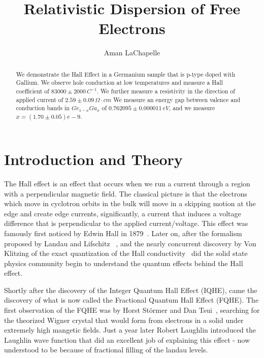 \documentclass[reprint, nobibnotes, amssymb, amsmath, amsfonts, physics, mathtools, mathrsfs, floatfix]{revtex4-1}
\begin{document}
  \title{Relativistic Dispersion of Free Electrons}

  \author{Aman LaChapelle}

  \begin{abstract}
    We demonstrate the Hall Effect in a Germanium sample that is p-type doped with Gallium.  We observe hole conduction at low temperatures and measure a Hall coefficient of $83000 \pm 2000\,C^{-1}$.  We further measure a resistivity in the direction of applied current of $2.59\pm0.09\,\Omega \cdot cm$  We measure an energy gap between valence and conduction bands in $Ge_{1-x}Ga_x$ of $0.762095\pm0.000011 \, eV$, and we measure $x = (1.70\pm0.05)e-9$.
  \end{abstract}

  \maketitle
  \tableofcontents

  \section{Introduction and Theory}
    The Hall effect is an effect that occurs when we run a current through a region with a perpendicular magnetic field.  The classical picture is that the electrons which move in cyclotron orbits in the bulk will move in a skipping motion at the edge and create edge currents, significantly, a current that induces a voltage difference that is perpendicular to the applied current/voltage.  This effect was famously first noticed by Edwin Hall in 1879~\cite{classical_hall}.  Later on, after the formalism proposed by Landau and Lifschitz ~\cite{landau}, and the nearly concurrent discovery by Von Klitzing of the exact quantization of the Hall conductivity~\cite{Von_Klitzing} did the solid state physics community begin to understand the quantum effects behind the Hall effect.

    Shortly after the discovery of the Integer Quantum Hall Effect (IQHE), came the discovery of what is now called the Fractional Quantum Hall Effect (FQHE).  The first observation of the FQHE was by Horst St\"{o}rmer and Dan Tsui~\cite{stormer_tsui}, searching for the theorized Wigner crystal that would form from electrons in a solid under extremely high mangetic fields.  Just a year later Robert Laughlin introduced the Laughlin wave function that did an excellent job of explaining this effect - now understood to be because of fractional filling of the landau levels.
\end{document}

